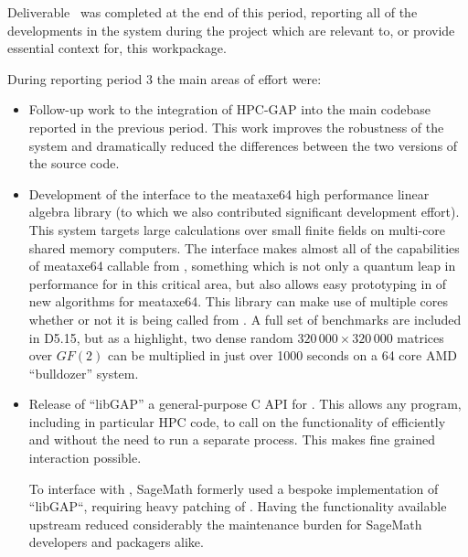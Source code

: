 Deliverable~ was completed at the end of this period,
reporting all of the developments in the \GAP system during the project which are relevant
to, or provide essential context for, this workpackage.

During reporting period 3 the main areas of effort were:
\begin{itemize}
\item Follow-up work to the integration of HPC-GAP into the main codebase reported in
  the previous period. This work improves the robustness of the system and dramatically reduced the
  differences between the two versions of the source code.
\item
  Development of the \GAP interface to the meataxe64 high performance linear algebra library (to which
  we also contributed significant development effort). This system targets large calculations over
  small finite fields on multi-core shared memory computers.
  The interface makes almost all of the
  capabilities of meataxe64 callable from \GAP, something which is not only a quantum leap in
  performance for \GAP in this critical area, but also allows easy prototyping in \GAP of new
  algorithms for meataxe64.  This library can make use of multiple cores whether or not it is being
  called from \HPCGAP. A full set of benchmarks are included in D5.15, but as a highlight, two
  dense random $320\,000\times 320\,000$ matrices over $GF(2)$ can be multiplied in just over 1000
  seconds on a 64 core AMD ``bulldozer'' system.
  \item Release of ``libGAP'' a general-purpose C API for \GAP. This allows any program, including in particular HPC code, to call on the
    functionality of \GAP efficiently and without the need to run a separate \GAP process. This makes
    fine grained interaction possible.

    To interface with \GAP, SageMath formerly used a bespoke
    implementation of ``libGAP``, requiring heavy patching of \GAP.
    Having the functionality available upstream reduced considerably
    the maintenance burden for SageMath developers and packagers
    alike.


\end{itemize}
